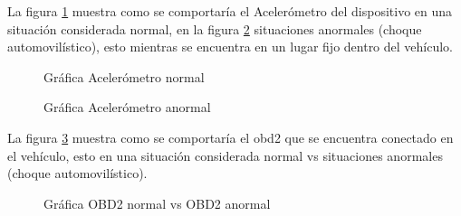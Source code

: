 La figura \ref{fig:NotificaAutoA} muestra como se comportaría el Acelerómetro del dispositivo en una situación considerada normal, en la figura \ref{fig:NotificaAutoAA} situaciones anormales (choque automovilístico), esto mientras se encuentra en un lugar fijo dentro del vehículo.
\begin{figure}[htbp!]
	\centering
	\caption{Gráfica Acelerómetro normal}
	\label{fig:NotificaAutoA}
\end{figure}

\begin{figure}[htbp!]
	\centering
	\caption{Gráfica Acelerómetro anormal}
	\label{fig:NotificaAutoAA}
\end{figure}

La figura \ref{fig:NotificaAutoO} muestra como se comportaría el obd2 que se encuentra conectado en el vehículo, esto en una situación considerada normal vs situaciones anormales (choque automovilístico). 
\begin{figure}[htbp!]
	\centering
	\caption{Gráfica OBD2 normal vs OBD2 anormal}
	\label{fig:NotificaAutoO}
\end{figure}


